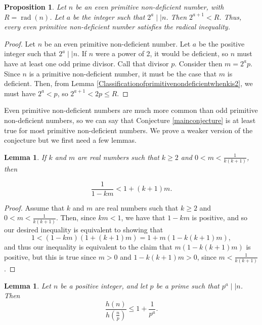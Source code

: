 \documentclass[12pt,reqno]{article}
\theoremstyle{plain}
\newtheorem{lemma}[theorem]{Lemma}
\newtheorem{proposition}[theorem]{Proposition}
\theoremstyle{definition}
\theoremstyle{remark}
\DeclareMathOperator{\rad}{rad}
\begin{document}
\begin{proposition} Let $n$ be an even primitive non-deficient number, with $R=\rad(n)$. Let $a$ be the integer such that $2^a \mid \mid n$. Then $2^{a+1} < R$. Thus, every even primitive non-deficient number satisfies the radical inequality. \label{evenprimitivenondeficientshaveatightbound}
\end{proposition}
\begin{proof}  Let $n$ be an even primitive non-deficient number. Let $a$ be the positive integer such that $2^a \mid \mid n$. If $n$ were a power of 2, it would be deficient, so $n$ must have at least one odd prime divisor. Call that divisor $p$. Consider then $m=2^a p$. Since $n$ is a primitive non-deficient number, it must be the case that $m$ is deficient. Then, from Lemma \ref{Classificationofprimitivenondeficientwhenkis2}, we must have $2^a <p$, so $2^{a+1} < 2p \leq R$.
\end{proof}

Even primitive non-deficient numbers are much more common than odd primitive non-deficient numbers, so we can say that Conjecture \ref{mainconjecture} is at least true for most primitive non-deficient numbers. We prove a weaker version of the conjecture but we first need a few lemmas.

\begin{lemma} If $k$ and $m$ are real numbers such that $k \geq 2$ and $0 < m < \frac{1}{k(k+1)}$, then 

\begin{equation}\frac{1}{1-km} < 1 + (k+1)m. \label{KMinequality}\end{equation} \label{KMlemma}
\end{lemma}
\begin{proof} Assume that $k$ and $m$ are real numbers such that $k \geq 2$ and $0 < m < \frac{1}{k(k+1)}$. Then, since $km<1$, we have that $1-km$ is positive, and so our desired inequality is equivalent to showing that 
$$1 < (1-km)(1+(k+1)m) = 1 + m(1 - k(k + 1)m), $$ and thus our inequality is equivalent to the claim that $m(1 - k(k + 1)m)$ is positive, but this is true since $m>0$ and $1 - k(k + 1)m>0$, since $m < \frac{1}{k(k+1)}$.
\end{proof}


\begin{lemma} Let $n$ be a positive integer, and let $p$ be a prime such that $p^a \mid \mid n$. Then $$\frac{h(n)}{h(\frac{n}{p})} \leq 1 + \frac{1}{p^a}. $$
\label{correctedPAlemma}
\end{lemma}
\end{document}
